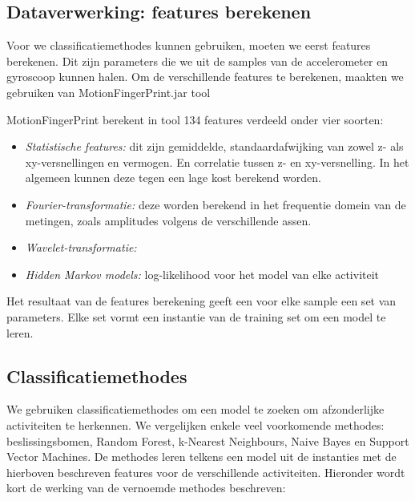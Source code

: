 \documentclass{article}
\begin{document}

\subsection{Dataverwerking: features berekenen}

Voor we classificatiemethodes kunnen gebruiken, moeten we eerst features berekenen. Dit zijn parameters die we uit de samples van de accelerometer en gyroscoop kunnen halen. Om de verschillende features te berekenen, maakten we gebruiken van MotionFingerPrint.jar tool %



MotionFingerPrint berekent in tool 134 features verdeeld onder vier soorten:
\begin{itemize}
\item \textit{Statistische features:}
 dit zijn gemiddelde, standaardafwijking van zowel z- als xy-versnellingen en vermogen. En correlatie tussen z- en xy-versnelling. In het algemeen kunnen deze tegen een lage kost berekend worden.
 
\item \textit{Fourier-transformatie:} deze worden berekend in het frequentie domein van de metingen, zoals amplitudes volgens de verschillende assen.

\item \textit{Wavelet-transformatie:} %

\item \textit{Hidden Markov models:} log-likelihood voor het model van elke activiteit
\end{itemize}

Het resultaat van de features berekening geeft een voor elke sample een set van parameters. Elke set vormt een instantie van de training set om een model te leren.

\subsection{Classificatiemethodes}

We gebruiken classificatiemethodes om een model te zoeken om afzonderlijke activiteiten te herkennen. We vergelijken enkele veel voorkomende methodes: beslissingsbomen, Random Forest, k-Nearest Neighbours, Naive Bayes en Support Vector Machines. De methodes leren telkens een model uit de instanties met de hierboven beschreven features voor de verschillende activiteiten. Hieronder wordt kort de werking van de vernoemde methodes beschreven:
\end{document}
